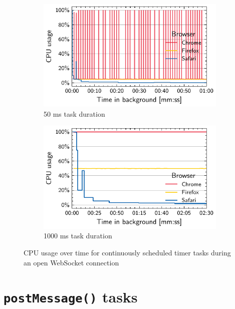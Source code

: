 \documentclass[
	ngerman,
	ruledheaders=section,%
	class=report,%
	thesis={type=bachelor},%
	accentcolor=9c,%
	custommargins=true,%
	marginpar=false,%
	parskip=half-,%
	fontsize=11pt,%
]{tudapub}
\begin{document}
  \begin{figure}
    \begin{subfigure}[t]{0.45\textwidth}
      \includegraphics[width=\textwidth]{images/websocket-50.pdf}
      \caption{50 ms task duration}
    \end{subfigure}
    \hfill
    \begin{subfigure}[t]{0.45\textwidth}
      \includegraphics[width=\textwidth]{images/websocket-1000.pdf}
      \caption{1000 ms task duration}
    \end{subfigure}

    \caption{CPU usage over time for continuously scheduled timer tasks during an open WebSocket connection}
    \label{fig:websocket}
  \end{figure}


  \section{\texttt{postMessage()} tasks}
\end{document}
